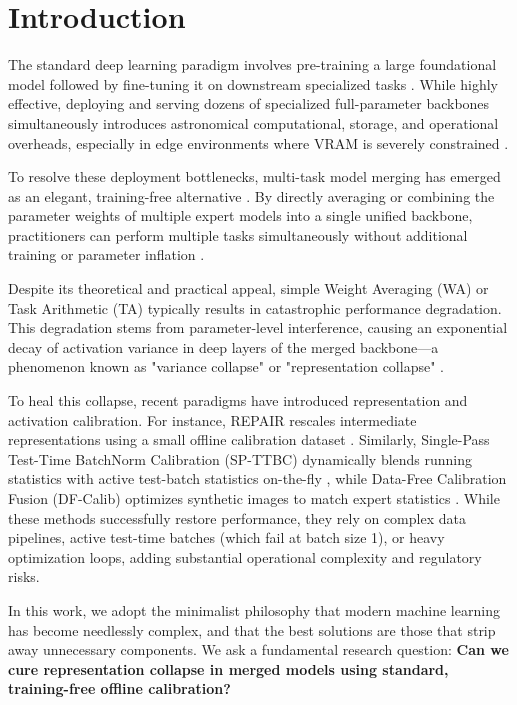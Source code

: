 \documentclass{article}
\theoremstyle{plain}
\theoremstyle{definition}
\theoremstyle{remark}
\begin{document}
\section{Introduction}
\label{submission_intro}
The standard deep learning paradigm involves pre-training a large foundational model followed by fine-tuning it on downstream specialized tasks \cite{devlin2018bert, radford2019language}. While highly effective, deploying and serving dozens of specialized full-parameter backbones simultaneously introduces astronomical computational, storage, and operational overheads, especially in edge environments where VRAM is severely constrained \cite{liang2022pragmatic}.

To resolve these deployment bottlenecks, multi-task model merging has emerged as an elegant, training-free alternative \cite{wortsman2022model, tang2023merging}. By directly averaging or combining the parameter weights of multiple expert models into a single unified backbone, practitioners can perform multiple tasks simultaneously without additional training or parameter inflation \cite{ilharco2022editing}.

Despite its theoretical and practical appeal, simple Weight Averaging (WA) or Task Arithmetic (TA) typically results in catastrophic performance degradation. This degradation stems from parameter-level interference, causing an exponential decay of activation variance in deep layers of the merged backbone---a phenomenon known as "variance collapse" or "representation collapse" \cite{jordan2023repair}.

To heal this collapse, recent paradigms have introduced representation and activation calibration. For instance, REPAIR rescales intermediate representations using a small offline calibration dataset \cite{jordan2023repair}. Similarly, Single-Pass Test-Time BatchNorm Calibration (SP-TTBC) dynamically blends running statistics with active test-batch statistics on-the-fly \cite{spttbc2026}, while Data-Free Calibration Fusion (DF-Calib) optimizes synthetic images to match expert statistics \cite{dfcalib2026}. While these methods successfully restore performance, they rely on complex data pipelines, active test-time batches (which fail at batch size 1), or heavy optimization loops, adding substantial operational complexity and regulatory risks.

In this work, we adopt the minimalist philosophy that modern machine learning has become needlessly complex, and that the best solutions are those that strip away unnecessary components. We ask a fundamental research question: \textbf{Can we cure representation collapse in merged models using standard, training-free offline calibration?}
\end{document}
